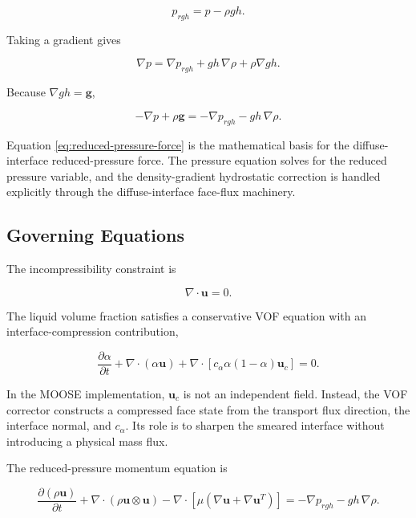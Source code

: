 \documentclass[11pt]{article}
\newcommand{\grad}{\nabla}
\newcommand{\divergence}{\nabla\!\cdot}
\begin{document}
\begin{equation}
  p_{rgh}=p-\rho gh.
  \label{eq:prgh}
\end{equation}

Taking a gradient gives

\begin{equation}
  \grad p
  =
  \grad p_{rgh}
  +
  gh\,\grad\rho
  +
  \rho\grad gh.
\end{equation}

Because \(\grad gh=\mathbf{g}\),

\begin{equation}
  -\grad p+\rho\mathbf{g}
  =
  -\grad p_{rgh}-gh\,\grad\rho.
  \label{eq:reduced-pressure-force}
\end{equation}

Equation \eqref{eq:reduced-pressure-force} is the mathematical basis for the
diffuse-interface reduced-pressure force.  The pressure equation solves for the
reduced pressure variable, and the density-gradient hydrostatic correction is
handled explicitly through the diffuse-interface face-flux machinery.

\subsection{Governing Equations}

The incompressibility constraint is

\begin{equation}
  \divergence\mathbf{u}=0.
  \label{eq:div-free}
\end{equation}

The liquid volume fraction satisfies a conservative VOF equation with an
interface-compression contribution,

\begin{equation}
  \frac{\partial\alpha}{\partial t}
  +
  \divergence(\alpha\mathbf{u})
  +
  \divergence\!\left[
    c_\alpha\alpha(1-\alpha)\mathbf{u}_c
  \right]
  =
  0.
  \label{eq:continuous-alpha}
\end{equation}

In the MOOSE implementation, \(\mathbf{u}_c\) is not an independent field.
Instead, the VOF corrector constructs a compressed face state from the transport
flux direction, the interface normal, and \(c_\alpha\).  Its role is to
sharpen the smeared interface without introducing a physical mass flux.

The reduced-pressure momentum equation is

\begin{equation}
  \frac{\partial(\rho\mathbf{u})}{\partial t}
  +
  \divergence(\rho\mathbf{u}\otimes\mathbf{u})
  -
  \divergence
  \left[
    \mu
    \left(\grad\mathbf{u}+\grad\mathbf{u}^{T}\right)
  \right]
  =
  -\grad p_{rgh}
  -
  gh\,\grad\rho.
  \label{eq:momentum-prgh}
\end{equation}
\end{document}
